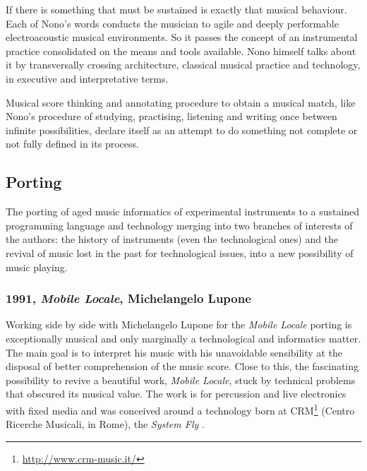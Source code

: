 If there is something that must be sustained is exactly that musical behaviour. Each of Nono's words conducts the musician to agile and deeply performable electroacoustic musical environments. So it passes the concept of an instrumental practice consolidated on the means and tools available. Nono himself talks about it by transversally crossing architecture, classical musical practice and technology, in executive and interpretative terms.

Musical score thinking and annotating procedure to obtain a musical match, like Nono's procedure of studying, practising, listening and writing once between infinite possibilities, declare itself as an attempt to do something not complete or not fully defined in its process.

\subsection*{Porting}

The porting of aged music informatics of experimental instruments to a sustained programming language and technology merging into two branches of interests of the authors: the history of instruments (even the technological ones) and the revival of music lost in the past for technological issues, into a new possibility of music playing.

\subsubsection*{1991, \emph{Mobile Locale}, Michelangelo Lupone}

Working side by side with Michelangelo Lupone for the \emph{Mobile Locale}
\cite{lmml91} porting is exceptionally musical and only marginally a technological and informatics matter. The main goal is to interpret his music with his unavoidable sensibility at the disposal of better comprehension of the music score. Close to this, the fascinating possibility to revive a beautiful work, \emph{Mobile Locale}, stuck by technical problems that obscured its musical value. The work is for percussion and live electronics with fixed media and was conceived around a technology born at CRM\footnote{\url{http://www.crm-music.it/}}
(Centro Ricerche Musicali, in Rome), the \emph{System Fly} \cite{ml85}.

\vfill\null

\raggedright



%
% 



